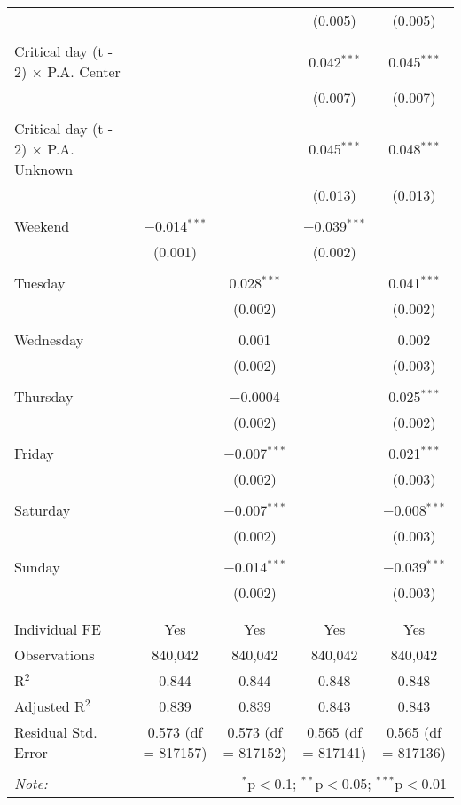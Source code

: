 \documentclass[
]{article}
\begin{document}
\begin{table}[!htbp]
{\begin{tabular}{@{\extracolsep{5pt}}lcccc}
  &  &  & (0.005) & (0.005) \\ 
  & & & & \\ 
 Critical day (t - 2) $\times$ P.A. Center &  &  & 0.042$^{***}$ & 0.045$^{***}$ \\ 
  &  &  & (0.007) & (0.007) \\ 
  & & & & \\ 
 Critical day (t - 2) $\times$ P.A. Unknown &  &  & 0.045$^{***}$ & 0.048$^{***}$ \\ 
  &  &  & (0.013) & (0.013) \\ 
  & & & & \\ 
 Weekend & $-$0.014$^{***}$ &  & $-$0.039$^{***}$ &  \\ 
  & (0.001) &  & (0.002) &  \\ 
  & & & & \\ 
 Tuesday &  & 0.028$^{***}$ &  & 0.041$^{***}$ \\ 
  &  & (0.002) &  & (0.002) \\ 
  & & & & \\ 
 Wednesday &  & 0.001 &  & 0.002 \\ 
  &  & (0.002) &  & (0.003) \\ 
  & & & & \\ 
 Thursday &  & $-$0.0004 &  & 0.025$^{***}$ \\ 
  &  & (0.002) &  & (0.002) \\ 
  & & & & \\ 
 Friday &  & $-$0.007$^{***}$ &  & 0.021$^{***}$ \\ 
  &  & (0.002) &  & (0.003) \\ 
  & & & & \\ 
 Saturday &  & $-$0.007$^{***}$ &  & $-$0.008$^{***}$ \\ 
  &  & (0.002) &  & (0.003) \\ 
  & & & & \\ 
 Sunday &  & $-$0.014$^{***}$ &  & $-$0.039$^{***}$ \\ 
  &  & (0.002) &  & (0.003) \\ 
  & & & & \\ 
\hline \\[-1.8ex] 
Individual FE & Yes & Yes & Yes & Yes \\ 
Observations & 840,042 & 840,042 & 840,042 & 840,042 \\ 
R$^{2}$ & 0.844 & 0.844 & 0.848 & 0.848 \\ 
Adjusted R$^{2}$ & 0.839 & 0.839 & 0.843 & 0.843 \\ 
Residual Std. Error & 0.573 (df = 817157) & 0.573 (df = 817152) & 0.565 (df = 817141) & 0.565 (df = 817136) \\ 
\hline 
\hline \\[-1.8ex] 
\textit{Note:}  & \multicolumn{4}{r}{$^{*}$p$<$0.1; $^{**}$p$<$0.05; $^{***}$p$<$0.01} \\ 
\end{tabular}
} 
\end{table} 
\newpage
\end{document}
